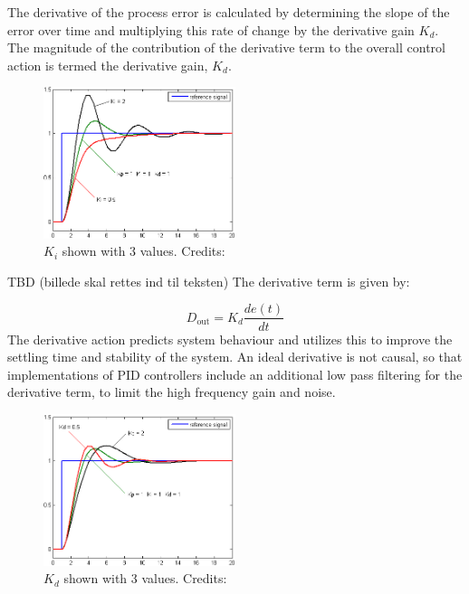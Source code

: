 The derivative of the process error is calculated by determining the slope of the error over time and multiplying this rate of change by the derivative gain $K_d$. The magnitude of the contribution of the derivative term to the overall control action is termed the derivative gain, $K_d$.
\begin{figure}[h!]
  \centering
  \includegraphics[width=0.5\textwidth]{figures/Change_with_Ki.png}
  
  \caption{$K_i$ shown with 3 values. Credits: %
  }
  \label{PID controller}
\end{figure}

TBD (billede skal rettes ind til teksten)
The derivative term is given by:

$$D_{\mathrm{out}}=K_d\frac{de(t)}{dt}$$
The derivative action predicts system behaviour and utilizes this to improve the settling time and stability of the system.
An ideal derivative is not causal, so that implementations of PID controllers include an additional low pass filtering for the derivative term, to limit the high frequency gain and noise.

\begin{figure}[h!]
  \centering
  \includegraphics[width=0.5\textwidth]{figures/Change_with_Kd.png}
  
  \caption{$K_d$ shown with 3 values. Credits: %
  }
  \label{PID controller}
\end{figure}



